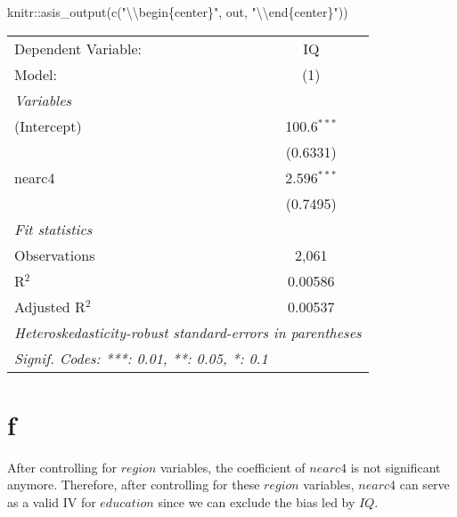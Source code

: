 \documentclass[
]{article}
\newenvironment{Shaded}{\begin{snugshade}}{\end{snugshade}}
\newcommand{\FunctionTok}[1]{\textcolor[rgb]{0.00,0.00,0.00}{#1}}
\newcommand{\NormalTok}[1]{#1}
\newcommand{\SpecialCharTok}[1]{\textcolor[rgb]{0.00,0.00,0.00}{#1}}
\newcommand{\StringTok}[1]{\textcolor[rgb]{0.31,0.60,0.02}{#1}}
\begin{document}
\begin{Shaded}
\begin{Highlighting}[]
\NormalTok{knitr}\SpecialCharTok{::}\FunctionTok{asis\_output}\NormalTok{(}\FunctionTok{c}\NormalTok{(}\StringTok{"}\SpecialCharTok{\textbackslash{}\textbackslash{}}\StringTok{begin\{center\}"}\NormalTok{, out, }\StringTok{"}\SpecialCharTok{\textbackslash{}\textbackslash{}}\StringTok{end\{center\}"}\NormalTok{)) }
\end{Highlighting}
\end{Shaded}

\begin{center}\begingroup\centering\begin{tabular}{lc}   \tabularnewline \midrule \midrule   Dependent Variable: & IQ\\     Model:              & (1)\\     \midrule   \emph{Variables}\\   (Intercept)         & 100.6$^{***}$\\                          & (0.6331)\\      nearc4              & 2.596$^{***}$\\                          & (0.7495)\\      \midrule   \emph{Fit statistics}\\   Observations        & 2,061\\     R$^2$               & 0.00586\\     Adjusted R$^2$      & 0.00537\\     \midrule \midrule   \multicolumn{2}{l}{\emph{Heteroskedasticity-robust standard-errors in parentheses}}\\   \multicolumn{2}{l}{\emph{Signif. Codes: ***: 0.01, **: 0.05, *: 0.1}}\\\end{tabular}\par\endgroup\end{center}

\newpage

\hypertarget{f}{%
\section{f}\label{f}}

After controlling for \(region\) variables, the coefficient of
\(nearc4\) is not significant anymore. Therefore, after controlling for
these \(region\) variables, \(nearc4\) can serve as a valid IV for
\(education\) since we can exclude the bias led by \(IQ\).
\end{document}
